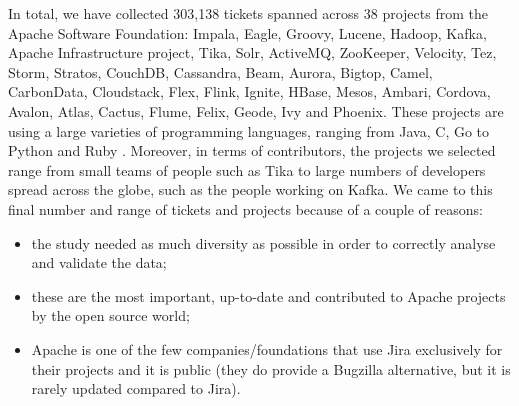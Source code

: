 \documentclass{mpaper}
\begin{document}
In total, we have collected 303,138 tickets spanned across 38 projects from the Apache Software Foundation: Impala, Eagle, Groovy, Lucene,
Hadoop, Kafka, Apache Infrastructure project, Tika, Solr, ActiveMQ, ZooKeeper, Velocity, Tez, Storm, Stratos, CouchDB, Cassandra, 
Beam, Aurora, Bigtop, Camel, CarbonData, Cloudstack, Flex, Flink, Ignite, HBase, Mesos, Ambari, Cordova, Avalon, Atlas, 
Cactus, Flume, Felix, Geode, Ivy and Phoenix. These projects are using a large varieties of programming languages, ranging from Java, C, 
Go to Python and Ruby \cite{apache_projects}. Moreover, in terms of contributors, the projects we selected range from small teams of people
such as Tika to large numbers of developers spread across the globe, such as the people working on Kafka. We came to this final number 
and range of tickets and projects because of a couple of reasons: 
\begin{itemize}
  \item the study needed as much diversity as possible in order to correctly analyse and validate the data;
  \item these are the most important, up-to-date and contributed to Apache projects by the open source world;
  \item Apache is one of the few companies/foundations that use Jira exclusively for their projects and it is public (they do 
  provide a Bugzilla alternative, but it is rarely updated compared to Jira).
\end{itemize}
\end{document}
